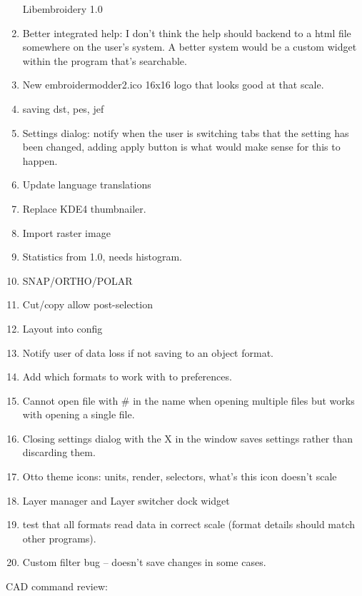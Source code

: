 \documentclass[a4paper, 11pt]{report}
\begin{document}
\begin{enumerate}
  Libembroidery 1.0
\item
  Better integrated help: I don't think the help should backend to a
  html file somewhere on the user's system. A better system would be a
  custom widget within the program that's searchable.
\item
  New embroidermodder2.ico 16x16 logo that looks good at that scale.
\item
  saving dst, pes, jef
\item
  Settings dialog: notify when the user is switching tabs that the
  setting has been changed, adding apply button is what would make sense
  for this to happen.
\item
  Update language translations
\item
  Replace KDE4 thumbnailer.
\item
  Import raster image
\item
  Statistics from 1.0, needs histogram.
\item
  SNAP/ORTHO/POLAR
\item
  Cut/copy allow post-selection
\item
  Layout into config
\item
  Notify user of data loss if not saving to an object format.
\item
  Add which formats to work with to preferences.
\item
  Cannot open file with \# in the name when opening multiple files but
  works with opening a single file.
\item
  Closing settings dialog with the X in the window saves settings rather
  than discarding them.
\item
  Otto theme icons: units, render, selectors, what's this icon doesn't
  scale
\item
  Layer manager and Layer switcher dock widget
\item
  test that all formats read data in correct scale (format details
  should match other programs).
\item
  Custom filter bug -- doesn't save changes in some cases.
\end{enumerate}

CAD command review:
\end{document}
